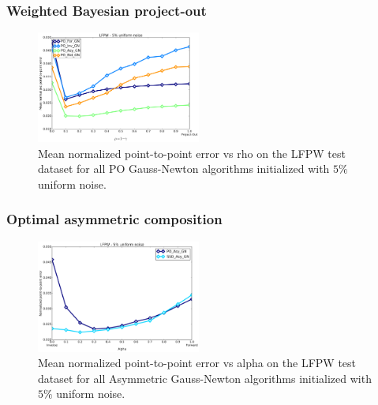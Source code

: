 





\subsubsection{Weighted Bayesian project-out}

\begin{figure}[h!]
	\includegraphics[width=0.48\textwidth]{experiments/rho/mean_error_vs_rho_5.png}
    \caption{Mean normalized point-to-point error vs rho on the LFPW test dataset for all PO Gauss-Newton algorithms initialized with $5\%$ uniform noise.}
    \label{fig:ced_ssd_gn_5}
\end{figure}

\subsubsection{Optimal asymmetric composition}

\begin{figure}[h!]
    \includegraphics[width=0.48\textwidth]{experiments/alpha/mean_error_vs_alpha_5.png}
    \caption{Mean normalized point-to-point error vs alpha on the LFPW test dataset for all Asymmetric Gauss-Newton algorithms initialized with $5\%$ uniform noise.}
    \label{fig:ced_ssd_gn_5}
\end{figure}

